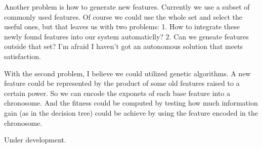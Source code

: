 Another problem is how to generate new features. Currently we use a subset of commonly used features. Of course we could use the whole set and select the useful ones, but that leaves us with two problems: 1. How to integrate these newly found features into our system automaticlly? 2. Can 
we geneate features outside that set? I'm afraid I haven't got an autonomous solution that meets satisfaction.

With the second problem, I believe we could utilized genetic algorithms. A new feature could be represented by the product of some old features raised to a certain power. So we can encode the exponets of each base feature into a chronosome. And the fitness could be computed by testing how much information gain (as in the decision tree) could be achieve by using the feature encoded in the chronosome.

Under development.
